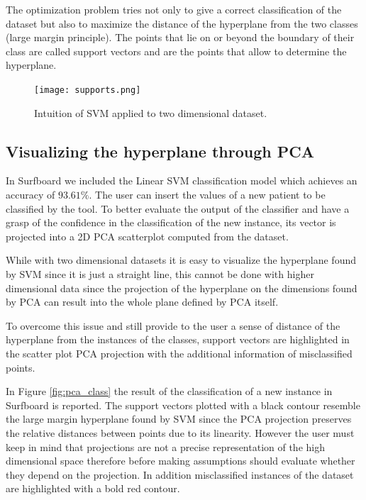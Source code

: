 \documentclass{article}
\begin{document}
The optimization problem tries not only to give a correct classification of the
dataset but also to maximize the distance of the hyperplane from the two
classes (large margin principle). The points that lie on or beyond the boundary
of their class are called support vectors and are the points that allow to
determine the hyperplane.


\begin{figure}[h]
\centering
\texttt{[image: supports.png]} \\
\caption{Intuition of SVM applied to two dimensional dataset.}
\label{fig:supports}
\end{figure}

\subsection{Visualizing the hyperplane through PCA}
\label{subsec:pcahyp}

In Surfboard we included the Linear SVM classification model which achieves an
accuracy of $93.61\%$. The user can insert the values of a new patient to be
classified by the tool. To better evaluate the output of the classifier
and have a grasp of the confidence in the classification of the new instance,
its vector is projected into a 2D PCA scatterplot computed from the dataset.

While with two dimensional datasets it is easy to visualize the hyperplane found
by SVM since it is just a straight line, this cannot be done with higher
dimensional data since the projection of the hyperplane on the dimensions found
by PCA can result into the whole plane defined by PCA itself.

To overcome this issue and still provide to the user a sense of distance of the
hyperplane from the instances of the classes, support vectors are highlighted in
the scatter plot PCA projection with the additional information of misclassified
points.

In Figure \ref{fig:pca_class} the result of the classification of a new instance
in Surfboard is reported. The support vectors plotted with a black contour
resemble the large margin hyperplane found by SVM since the PCA projection
preserves the relative distances between points due to its linearity. However
the user must keep in mind that projections are not a precise representation of
the high dimensional space therefore before making assumptions should evaluate
whether they depend on the projection. In addition misclassified instances of
the dataset are highlighted with a bold red contour.
\end{document}
